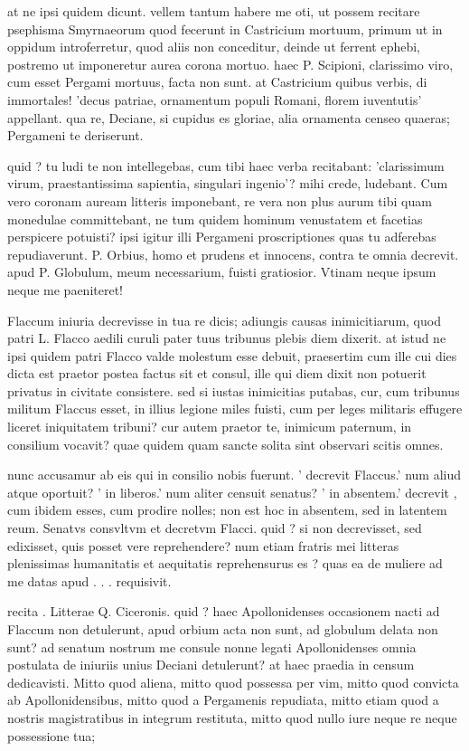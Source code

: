  at ne ipsi quidem dicunt. vellem tantum habere me oti, ut possem recitare psephisma Smyrnaeorum quod fecerunt in Castricium mortuum, primum ut in oppidum introferretur, quod aliis non conceditur, deinde ut ferrent ephebi, postremo ut imponeretur aurea corona mortuo. haec P. Scipioni, clarissimo viro, cum esset Pergami mortuus, facta non sunt. at Castricium quibus verbis, di immortales! 'decus patriae, ornamentum populi Romani, florem iuventutis' appellant. qua re, Deciane, si cupidus es gloriae, alia ornamenta censeo quaeras; Pergameni te deriserunt.

 quid ? tu ludi te non intellegebas, cum tibi haec verba recitabant: 'clarissimum virum, praestantissima sapientia, singulari ingenio'? mihi crede, ludebant. Cum vero coronam auream litteris imponebant, re vera non plus aurum tibi quam monedulae committebant, ne tum quidem hominum venustatem et facetias perspicere potuisti? ipsi igitur illi Pergameni proscriptiones quas tu adferebas repudiaverunt. P. Orbius, homo et prudens et innocens, contra te omnia decrevit. apud P. Globulum, meum necessarium, fuisti gratiosior. Vtinam neque ipsum neque me paeniteret!

 Flaccum iniuria decrevisse in tua re dicis; adiungis causas inimicitiarum, quod patri L. Flacco aedili curuli pater tuus tribunus plebis diem dixerit. at istud ne ipsi quidem patri Flacco valde molestum esse debuit, praesertim cum ille cui dies dicta est praetor postea factus sit et consul, ille qui diem dixit non potuerit privatus in civitate consistere. sed si iustas inimicitias putabas, cur, cum tribunus militum Flaccus esset, in illius legione miles fuisti, cum per leges militaris effugere liceret iniquitatem tribuni? cur autem praetor te, inimicum paternum, in consilium vocavit? quae quidem quam sancte solita sint observari scitis omnes.

 nunc accusamur ab eis qui in consilio nobis fuerunt. ' decrevit Flaccus.' num aliud atque oportuit? ' in liberos.' num aliter censuit senatus? ' in absentem.' decrevit , cum ibidem esses, cum prodire nolles; non est hoc in absentem, sed in latentem reum. Senatvs consvltvm et decretvm Flacci. quid ? si non decrevisset, sed edixisset, quis posset vere reprehendere? num etiam fratris mei litteras plenissimas humanitatis et aequitatis reprehensurus es ? quas ea de muliere ad me datas apud . . . requisivit.

 recita . Litterae Q. Ciceronis. quid ? haec Apollonidenses occasionem nacti ad Flaccum non detulerunt, apud orbium acta non sunt, ad globulum delata non sunt? ad senatum nostrum me consule nonne legati Apollonidenses omnia postulata de iniuriis unius Deciani detulerunt? at haec praedia in censum dedicavisti. Mitto quod aliena, mitto quod possessa per vim, mitto quod convicta ab Apollonidensibus, mitto quod a Pergamenis repudiata, mitto etiam quod a nostris magistratibus in integrum restituta, mitto quod nullo iure neque re neque possessione tua;

